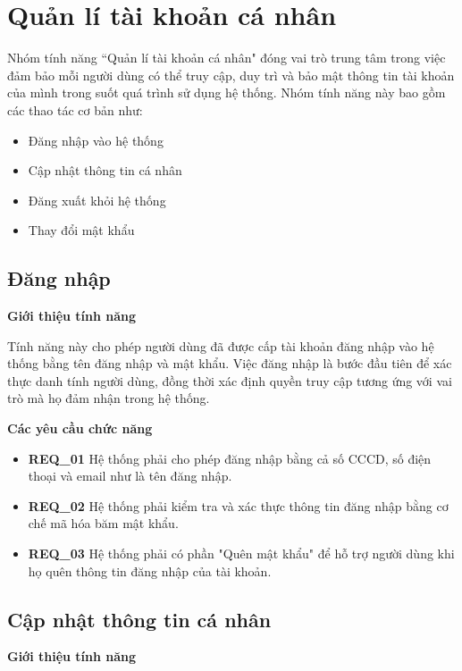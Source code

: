 \section{Quản lí tài khoản cá nhân}

Nhóm tính năng ``Quản lí tài khoản cá nhân" đóng vai trò trung tâm trong việc đảm bảo mỗi người dùng có thể truy cập, duy trì và bảo mật thông tin tài khoản của mình trong suốt quá trình sử dụng hệ thống. Nhóm tính năng này bao gồm các thao tác cơ bản như:
\begin{itemize}
  \item Đăng nhập vào hệ thống
  \item Cập nhật thông tin cá nhân
  \item Đăng xuất khỏi hệ thống
  \item Thay đổi mật khẩu
\end{itemize}

\subsection{Đăng nhập}

\noindent \textbf{Giới thiệu tính năng}

Tính năng này cho phép người dùng đã được cấp tài khoản đăng nhập vào hệ thống bằng tên đăng nhập và mật khẩu. Việc đăng nhập là bước đầu tiên để xác thực danh tính người dùng, đồng thời xác định quyền truy cập tương ứng với vai trò mà họ đảm nhận trong hệ thống.

\noindent \textbf{Các yêu cầu chức năng}

\begin{itemize}
  \item \textbf{REQ\_01} Hệ thống phải cho phép đăng nhập bằng cả số CCCD, số điện thoại và email như là tên đăng nhập.
  \item \textbf{REQ\_02} Hệ thống phải kiểm tra và xác thực thông tin đăng nhập bằng cơ chế mã hóa băm mật khẩu.
  \item \textbf{REQ\_03} Hệ thống phải có phần "Quên mật khẩu" để hỗ trợ người dùng khi họ quên thông tin đăng nhập của tài khoản.

\end{itemize}

\subsection{Cập nhật thông tin cá nhân}

\noindent \textbf{Giới thiệu tính năng}

